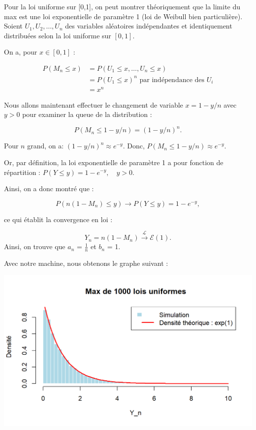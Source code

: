 \documentclass{article}
\begin{document}
\noindent Pour la loi uniforme sur [0,1], on peut montrer théoriquement que la limite du max est une loi exponentielle de paramètre 1 (loi de Weibull bien particulière). \\
\noindent Soient \( U_1, U_2, \dots, U_n \) des variables aléatoires indépendantes et identiquement distribuées selon la loi uniforme sur \([0,1]\).

\noindent On a, pour $ x \in [0,1]$ :

\begin{align*}
	P(M_n \leq x) &= P(U_1 \leq x, \dots, U_n \leq x) \\
	&= P(U_1 \leq x)^n \text{ par indépendance des $U_i$}\\
	&= x^n
\end{align*}

\noindent Nous allons maintenant effectuer le changement de variable $ x = 1 - y/n $ avec $y > 0 $ pour examiner la queue de la distribution :

\[
P(M_n \leq 1 - y/n) = (1 - y/n)^n.
\]

\noindent Pour $ n $ grand, on a: $(1 - y/n)^n \approx e^{-y} $. Donc, $ P(M_n \leq 1 - y/n) \approx e^{-y} $.


\noindent Or, par définition, la loi exponentielle de paramètre 1 a pour fonction de répartition : $ P(Y \leq y) = 1 - e^{-y}, \quad y > 0. $

\noindent Ainsi, on a donc montré que :

\[
P(n(1 - M_n) \leq y) \to P(Y \leq y) = 1 - e^{-y},
\]

\noindent ce qui établit la convergence en loi :

\[
Y_n = n(1 - M_n) \xrightarrow{\mathcal{L}} \mathcal{E}(1).
\] 
\noindent Ainsi, on trouve que $a_n$ = $\frac{1}{n}$ et $b_n$ = 1.

\noindent Avec notre machine, nous obtenons le graphe suivant :

\begin{center}
	\includegraphics[scale=0.8]{./images/Max_Uniforme.png} 
\end{center}
\end{document}
